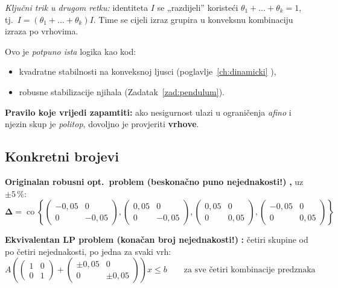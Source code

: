 \emph{Ključni trik u drugom retku:} identiteta $I$ se „razdijeli” koristeći
$\theta_1 + \dots + \theta_k = 1$, tj.\ $I = (\theta_1+\dots+\theta_k)I$. Time
se cijeli izraz grupira u konveksnu kombinaciju izraza po vrhovima.

\begin{napomena}
Ovo je \emph{potpuno ista} logika kao kod:
\begin{itemize}
  \item kvadratne stabilnosti na konveksnoj ljusci
        (poglavlje~\ref{ch:dinamicki} ),
  \item robusne stabilizacije njihala (Zadatak~\ref{zad:pendulum}).
\end{itemize}
\textbf{Pravilo koje vrijedi zapamtiti:} ako nesigurnost ulazi u ograničenja
\emph{afino} i njezin skup je \emph{politop}, dovoljno je provjeriti
\textbf{vrhove}.
\end{napomena}

\subsection{Konkretni brojevi}

\textbf{Originalan robusni opt.\ problem (beskonačno puno nejednakosti!)}
\textbf{,} uz $\pm5\,\%$:
\[
\boldsymbol\Delta = \operatorname{co}\left\{
\begin{pmatrix}-0{,}05&0\\0&-0{,}05\end{pmatrix},
\begin{pmatrix}0{,}05&0\\0&-0{,}05\end{pmatrix},
\begin{pmatrix}0{,}05&0\\0&0{,}05\end{pmatrix},
\begin{pmatrix}-0{,}05&0\\0&0{,}05\end{pmatrix}
\right\}
\]

\textbf{Ekvivalentan LP problem (konačan broj nejednakosti!)} \textbf{:}
četiri skupine od po četiri nejednakosti, po jedna za svaki vrh:
\[
A\left(\begin{pmatrix}1&0\\0&1\end{pmatrix}
+ \begin{pmatrix}\pm0{,}05&0\\0&\pm0{,}05\end{pmatrix}\right)x \le b
\qquad\text{za sve četiri kombinacije predznaka}
\]

